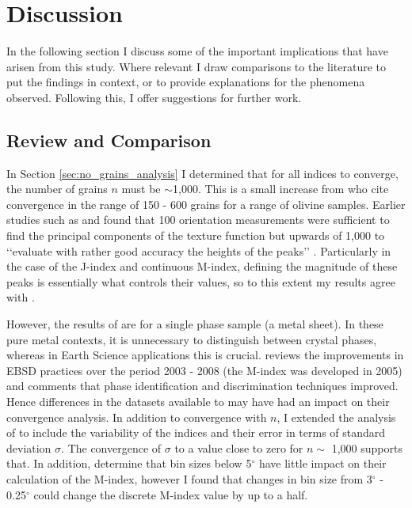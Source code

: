 \documentclass[a4paper,12pt,twoside]{report}
\numberwithin{equation}{chapter}
\begin{document}
\chapter{Discussion} \label{chap:discussion}
\vspace{-1cm}
In the following section I discuss some of the important implications that have arisen from this study. Where relevant I draw comparisons to the literature to put the findings in context, or to provide explanations for the phenomena observed. Following this, I offer suggestions for further work.


\section{Review and Comparison} \label{sec:diss_results_comp}

In Section \ref{sec:no_grains_analysis} I determined that for all indices to converge, the number of grains $n$ must be $\sim$1,000. This is a small increase from \cite{Skemer} who cite convergence in the range of 150 - 600 grains for a range of olivine samples. Earlier studies such as \cite{Wright1990} and \cite{Baudin1993} found that 100 orientation measurements were sufficient to find the principal components of the texture function but upwards of 1,000 to \lq\lq{}evaluate with rather good accuracy the heights of the peaks\rq\rq{} \citep{Baudin1993}. Particularly in the case of the J-index and continuous M-index, defining the magnitude of these peaks is essentially what controls their values, so to this extent my results agree with \cite{Baudin1993}. 

However, the results of \cite{Baudin1993} are for a single phase sample (a metal sheet). In these pure metal contexts, it is unnecessary to distinguish between crystal phases, whereas in Earth Science applications this is crucial. \cite{Randle2009} reviews the improvements in EBSD practices over the period 2003 - 2008 (the M-index was developed in 2005) and comments that phase identification and discrimination techniques improved. Hence differences in the datasets available to \cite{Skemer} may have had an impact on their convergence analysis. In addition to convergence with $n$, I extended the analysis of \cite{Skemer} to include the variability of the indices and their error in terms of standard deviation $\sigma$. The convergence of $\sigma$ to a value close to zero for     
$n \sim$ 1,000 supports that. In addition, \cite{Skemer} determine that bin sizes below 5$^\circ$ have little impact on their calculation of the M-index, however I found that changes in bin size from 3$^\circ$ - 0.25$^\circ$ could change the discrete M-index value by up to a half. 
\end{document}
